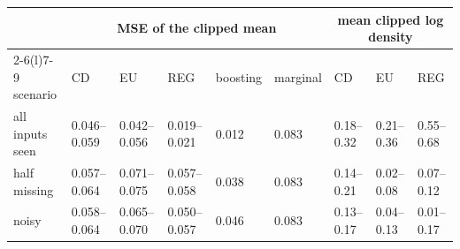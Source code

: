 \scriptsize\setlength{\tabcolsep}{3.5pt}
\begin{tabular}{lllllllll}
\toprule
& \multicolumn{5}{c}{MSE of the clipped mean} & \multicolumn{3}{c}{mean clipped log density} \\ \cmidrule(lr){2-6}\cmidrule(l){7-9}
scenario & CD & EU & REG & boosting & marginal & CD & EU & REG \\
\midrule
all inputs seen & 0.046--0.059 & 0.042--0.056 & 0.019--0.021 & 0.012 & 0.083 & 0.18--0.32 & 0.21--0.36 & 0.55--0.68 \\
half missing & 0.057--0.064 & 0.071--0.075 & 0.057--0.058 & 0.038 & 0.083 & 0.14--0.21 & 0.02--0.08 & 0.07--0.12 \\
noisy & 0.058--0.064 & 0.065--0.070 & 0.050--0.057 & 0.046 & 0.083 & 0.13--0.17 & 0.04--0.13 & 0.01--0.17 \\
\bottomrule
\end{tabular}
